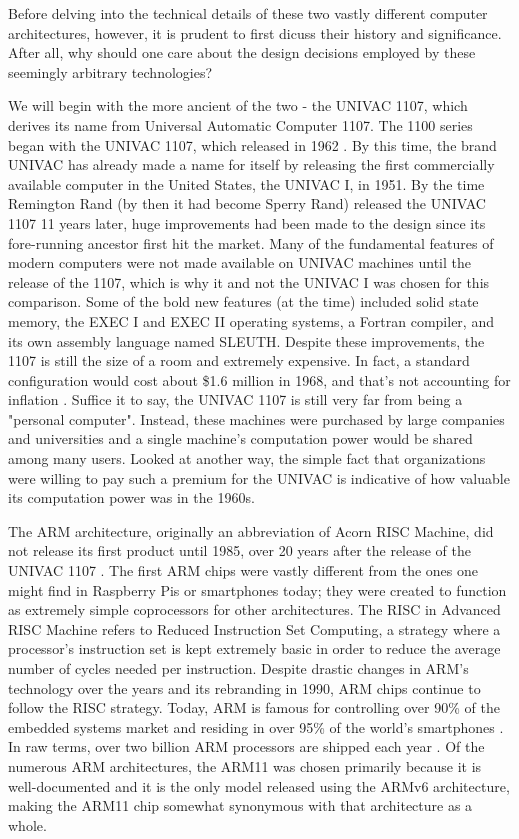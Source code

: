 \documentclass[onecolumn, draftclsnofoot, 10pt, compsoc]{IEEEtran}
\begin{document}
Before delving into the technical details of these two vastly different computer architectures, however, it is prudent to first dicuss their history and significance. After all, why should one care about the design decisions employed by these seemingly arbitrary technologies? 

We will begin with the more ancient of the two - the UNIVAC 1107, which derives its name from Universal Automatic Computer 1107. The 1100 series began with the UNIVAC 1107, which released in 1962 \cite{univacwiki}. By this time, the brand UNIVAC has already made a name for itself by releasing the first commercially available computer in the United States, the UNIVAC I, in 1951. By the time Remington Rand (by then it had become Sperry Rand) released the UNIVAC 1107 11 years later, huge improvements had been made to the design since its fore-running ancestor first hit the market. Many of the fundamental features of modern computers were not made available on UNIVAC machines until the release of the 1107, which is why it and not the UNIVAC I was chosen for this comparison. Some of the bold new features (at the time) included solid state memory, the EXEC I and EXEC II operating systems, a Fortran compiler, and its own assembly language named SLEUTH. Despite these improvements, the 1107 is still the size of a room and extremely expensive. In fact, a standard configuration would cost about \$1.6 million in 1968, and that's not accounting for inflation \cite{univacprice}. Suffice it to say, the UNIVAC 1107 is still very far from being a "personal computer". Instead, these machines were purchased by large companies and universities and a single machine's computation power would be shared among many users. Looked at another way, the simple fact that organizations were willing to pay such a premium for the UNIVAC is indicative of how valuable its computation power was in the 1960s.

The ARM architecture, originally an abbreviation of Acorn RISC Machine, did not release its first product until 1985, over 20 years after the release of the UNIVAC 1107 \cite{armwiki}. The first ARM chips were vastly different from the ones one might find in Raspberry Pis or smartphones today; they were created to function as extremely simple coprocessors for other architectures. The RISC in Advanced RISC Machine refers to Reduced Instruction Set Computing, a strategy where a processor's instruction set is kept extremely basic in order to reduce the average number of cycles needed per instruction. Despite drastic changes in ARM's technology over the years and its rebranding in 1990, ARM chips continue to follow the RISC strategy. Today, ARM is famous for controlling over 90\% of the embedded systems market and residing in over 95\% of the world's smartphones \cite{armslides} \cite{armwiki}. In raw terms, over two billion ARM processors are shipped each year \cite{armslides}. Of the numerous ARM architectures, the ARM11 was chosen primarily because it is well-documented and it is the only model released using the ARMv6 architecture, making the ARM11 chip somewhat synonymous with that architecture as a whole. 
\end{document}
